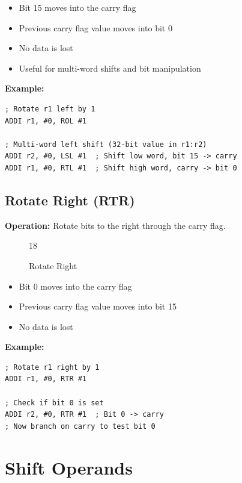 \begin{itemize}
	\item Bit 15 moves into the carry flag
	\item Previous carry flag value moves into bit 0
	\item No data is lost
	\item Useful for multi-word shifts and bit manipulation
\end{itemize}

\textbf{Example:}
\begin{lstlisting}
; Rotate r1 left by 1
ADDI r1, #0, ROL #1

; Multi-word left shift (32-bit value in r1:r2)
ADDI r2, #0, LSL #1  ; Shift low word, bit 15 -> carry
ADDI r1, #0, RTL #1  ; Shift high word, carry -> bit 0
\end{lstlisting}

\subsection{Rotate Right (RTR)}

\textbf{Operation:} Rotate bits to the right through the carry flag.

\begin{figure}[H]
	\centering
	\begin{bytefield}[bitwidth=1.2em]{18}
		 \\
	\end{bytefield}
	\caption{Rotate Right}
\end{figure}

\begin{itemize}
	\item Bit 0 moves into the carry flag
	\item Previous carry flag value moves into bit 15
	\item No data is lost
\end{itemize}

\textbf{Example:}
\begin{lstlisting}
; Rotate r1 right by 1
ADDI r1, #0, RTR #1

; Check if bit 0 is set
ADDI r2, #0, RTR #1  ; Bit 0 -> carry
; Now branch on carry to test bit 0
\end{lstlisting}

\section{Shift Operands}

